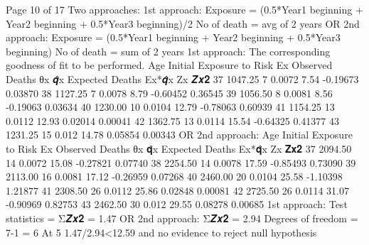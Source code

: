 Page 10 of 17
Two approaches:
1st approach:
Exposure = (0.5*Year1 beginning + Year2 beginning + 0.5*Year3 beginning)/2
No of death = avg of 2 years
OR
2nd approach:
Exposure = (0.5*Year1 beginning + Year2 beginning + 0.5*Year3 beginning)
No of death = sum of 2 years
1st approach:
The corresponding goodness of fit to be performed.
Age
Initial Exposure to Risk Ex
Observed Deaths θx
𝒒̂x
Expected Deaths
Ex*𝒒̂x
Zx
𝒁𝒙𝟐
37
1047.25
7
0.0072
7.54
-0.19673
0.03870
38
1127.25
7
0.0078
8.79
-0.60452
0.36545
39
1056.50
8
0.0081
8.56
-0.19063
0.03634
40
1230.00
10
0.0104
12.79
-0.78063
0.60939
41
1154.25
13
0.0112
12.93
0.02014
0.00041
42
1362.75
13
0.0114
15.54
-0.64325
0.41377
43
1231.25
15
0.012
14.78
0.05854
0.00343
OR
2nd approach:
Age
Initial Exposure to Risk Ex
Observed Deaths θx
𝐪̂x
Expected Deaths
Ex*𝐪̂x
Zx
𝐙𝐱𝟐
37
2094.50
14
0.0072
15.08
-0.27821
0.07740
38
2254.50
14
0.0078
17.59
-0.85493
0.73090
39
2113.00
16
0.0081
17.12
-0.26959
0.07268
40
2460.00
20
0.0104
25.58
-1.10398
1.21877
41
2308.50
26
0.0112
25.86
0.02848
0.00081
42
2725.50
26
0.0114
31.07
-0.90969
0.82753
43
2462.50
30
0.012
29.55
0.08278
0.00685
1st approach:
Test statistics = Σ𝒁𝒙𝟐 = 1.47
OR
2nd approach:
Σ𝒁𝒙𝟐 = 2.94
Degrees of freedom = 7-1 = 6
At 5%
1.47/2.94<12.59 and no evidence to reject null hypothesis

